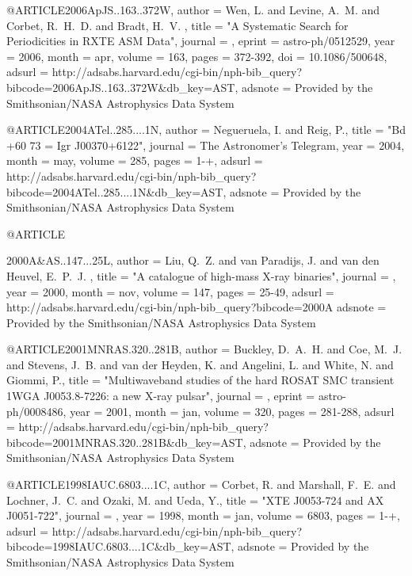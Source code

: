 {{{{{{{@ARTICLE{2006ApJS..163..372W,
   author = {{Wen}, L. and {Levine}, A.~M. and {Corbet}, R.~H.~D. and {Bradt}, H.~V.
	},
    title = "{A Systematic Search for Periodicities in RXTE ASM Data}",
  journal = {\apjs},
   eprint = {astro-ph/0512529},
     year = 2006,
    month = apr,
   volume = 163,
    pages = {372-392},
      doi = {10.1086/500648},
   adsurl = {http://adsabs.harvard.edu/cgi-bin/nph-bib_query?bibcode=2006ApJS..163..372W&db_key=AST},
  adsnote = {Provided by the Smithsonian/NASA Astrophysics Data System}
}



@ARTICLE{2004ATel..285....1N,
   author = {{Negueruela}, I. and {Reig}, P.},
    title = "{Bd +60 73 = Igr J00370+6122}",
  journal = {The Astronomer's Telegram},
     year = 2004,
    month = may,
   volume = 285,
    pages = {1-+},
   adsurl = {http://adsabs.harvard.edu/cgi-bin/nph-bib_query?bibcode=2004ATel..285....1N&db_key=AST},
  adsnote = {Provided by the Smithsonian/NASA Astrophysics Data System}
}



@ARTICLE{2000A&AS..147...25L,
   author = {{Liu}, Q.~Z. and {van Paradijs}, J. and {van den Heuvel}, E.~P.~J.
	},
    title = "{A catalogue of high-mass X-ray binaries}",
  journal = {\aaps},
     year = 2000,
    month = nov,
   volume = 147,
    pages = {25-49},
   adsurl = {http://adsabs.harvard.edu/cgi-bin/nph-bib_query?bibcode=2000A%
  adsnote = {Provided by the Smithsonian/NASA Astrophysics Data System}
}



@ARTICLE{2001MNRAS.320..281B,
   author = {{Buckley}, D.~A.~H. and {Coe}, M.~J. and {Stevens}, J.~B. and 
	{van der Heyden}, K. and {Angelini}, L. and {White}, N. and 
	{Giommi}, P.},
    title = "{Multiwaveband studies of the hard ROSAT SMC transient 1WGA J0053.8-7226: a new X-ray pulsar}",
  journal = {\mnras},
   eprint = {astro-ph/0008486},
     year = 2001,
    month = jan,
   volume = 320,
    pages = {281-288},
   adsurl = {http://adsabs.harvard.edu/cgi-bin/nph-bib_query?bibcode=2001MNRAS.320..281B&db_key=AST},
  adsnote = {Provided by the Smithsonian/NASA Astrophysics Data System}
}



@ARTICLE{1998IAUC.6803....1C,
   author = {{Corbet}, R. and {Marshall}, F.~E. and {Lochner}, J.~C. and 
	{Ozaki}, M. and {Ueda}, Y.},
    title = "{XTE J0053-724 and AX J0051-722}",
  journal = {\iaucirc},
     year = 1998,
    month = jan,
   volume = 6803,
    pages = {1-+},
   adsurl = {http://adsabs.harvard.edu/cgi-bin/nph-bib_query?bibcode=1998IAUC.6803....1C&db_key=AST},
  adsnote = {Provided by the Smithsonian/NASA Astrophysics Data System}
}



}}}}}}}}
